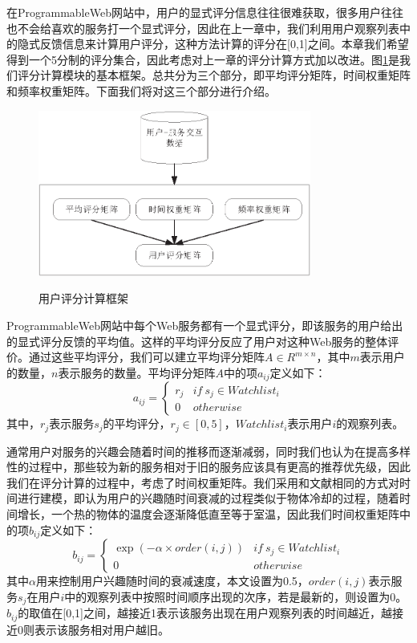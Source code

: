 \documentclass[master,winfonts]{njuthesis}
\begin{document}
在ProgrammableWeb网站中，用户的显式评分信息往往很难获取，很多用户往往也不会给喜欢的服务打一个显式评分，因此在上一章中，我们利用用户观察列表中的隐式反馈信息来计算用户评分，这种方法计算的评分在[0,1]之间。本章我们希望得到一个5分制的评分集合，因此考虑对上一章的评分计算方式加以改进。图\ref{fig:4-1}是我们评分计算模块的基本框架。总共分为三个部分，即平均评分矩阵，时间权重矩阵和频率权重矩阵。下面我们将对这三个部分进行介绍。
\begin{figure}[htbp]
  \centering
  \includegraphics[width=0.8\textwidth]{rating.eps}\\
  \caption{用户评分计算框架}\label{fig:4-1}
\end{figure}

ProgrammableWeb网站中每个Web服务都有一个显式评分，即该服务的用户给出的显式评分反馈的平均值。这样的平均评分反应了用户对这种Web服务的整体评价。通过这些平均评分，我们可以建立平均评分矩阵$A \in R^{m \times n}$，其中$m$表示用户的数量，$n$表示服务的数量。平均评分矩阵$A$中的项$a_{ij}$定义如下：
\begin{equation}
a_{ij}= \begin{cases}r_{j} & if \ s_j \in Watchlist_i\\0 & otherwise \end{cases}
\end{equation}
其中，$r_j$表示服务$s_j$的平均评分，$r_j \in \left [0,5 \right ]$，$Watchlist_i$表示用户$i$的观察列表。

通常用户对服务的兴趣会随着时间的推移而逐渐减弱，同时我们也认为在提高多样性的过程中，那些较为新的服务相对于旧的服务应该具有更高的推荐优先级，因此我们在评分计算的过程中，考虑了时间权重矩阵。我们采用和文献\cite{Zhang2014Web}相同的方式对时间进行建模，即认为用户的兴趣随时间衰减的过程类似于物体冷却的过程，随着时间增长，一个热的物体的温度会逐渐降低直至等于室温，因此我们时间权重矩阵中的项$b_{ij}$定义如下：
\begin{equation}
b_{ij}= \begin{cases} \exp(-\alpha \times order(i,j))& if \ s_j \in Watchlist_i\\0 & otherwise \end{cases}\label{eq:4-1}
\end{equation}
其中$\alpha$用来控制用户兴趣随时间的衰减速度，本文设置为0.5，$order(i,j)$表示服务$s_j$在用户$i$中的观察列表中按照时间顺序出现的次序，若是最新的，则设置为0。$b_{ij}$的取值在[0,1]之间，越接近1表示该服务出现在用户观察列表的时间越近，越接近0则表示该服务相对用户越旧。
\end{document}
